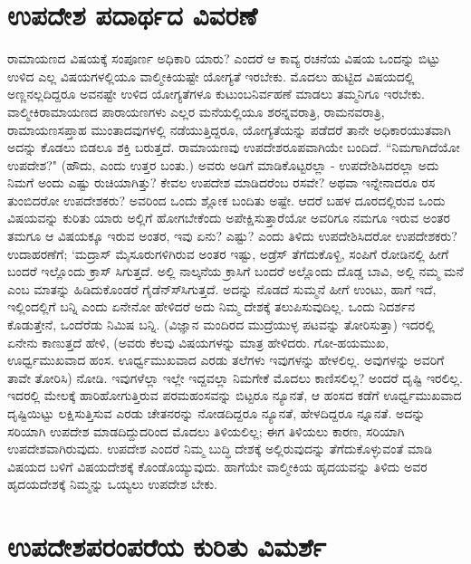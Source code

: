 \section*{ಉಪದೇಶ ಪದಾರ್ಥದ ವಿವರಣೆ} 

ರಾಮಾಯಣದ ವಿಷಯಕ್ಕೆ ಸಂಪೂರ್ಣ ಅಧಿಕಾರಿ ಯಾರು? ಎಂದರೆ ಆ ಕಾವ್ಯ ರಚನೆಯ ವಿಷಯ ಒಂದನ್ನು ಬಿಟ್ಟು ಉಳಿದ ಎಲ್ಲ ವಿಷಯಗಳಲ್ಲಿಯೂ ವಾಲ್ಮೀಕಿಯಷ್ಟೇ ಯೋಗ್ಯತೆ ಇರಬೇಕು. ಮೊದಲು ಹುಟ್ಟಿದ ವಿಷಯದಲ್ಲಿ ಅಣ್ಣನಲ್ಲದಿದ್ದರೂ ಅವನಷ್ಟೇ ಉಳಿದ ಯೋಗ್ಯತೆಗಳೂ ಕುಟುಂಬನಿರ್ವಹಣೆ ಮಾಡಲು ತಮ್ಮನಿಗೂ ಇರಬೇಕು. ವಾಲ್ಮೀಕಿರಾಮಾಯಣದ ಪಾರಾಯಣಗಳು ಎಲ್ಲರ ಮನೆಯಲ್ಲಿಯೂ ಶರನ್ನವರಾತ್ರಿ, ರಾಮನವರಾತ್ರಿ, ರಾಮಾಯಣಸಪ್ತಾಹ ಮುಂತಾದವುಗಳಲ್ಲಿ ನಡೆಯುತ್ತಿದ್ದರೂ, ಯೋಗ್ಯತೆಯನ್ನು ಪಡೆದರೆ ತಾನೇ ಅಧಿಕಾರಯುತವಾಗಿ ಅದನ್ನು ಕೊಡಲು ಬಿಡಲೂ ಶಕ್ತಿ ಬರುತ್ತದೆ. ರಾಮಾಯಣವು ಉಪದೇಶರೂಪವಾಗಿಯೇ ಬಂದಿದೆ. ``ನಿಮಗಾಗಿದೆಯೋ ಉಪದೇಶ?" (ಹೌದು, ಎಂದು ಉತ್ತರ ಬಂತು.) ಅವರು ಅಡಿಗೆ ಮಾಡಿಕೊಟ್ಟರಲ್ಲಾ - ಉಪದೇಶಿಸಿದರಲ್ಲಾ ಅದು ನಿಮಗೆ ಅಂದು ಎಷ್ಟು ರುಚಿಯಾಗಿತ್ತು? ಕೇವಲ ಉಪದೇಶ ಮಾಡಿದರೆಂಬ ರಸವೇ? ಅಥವಾ ಇನ್ನೇನಾದರೂ ರಸ ತುಂಬಿದರೋ ಉಪದೇಶಕರು? ಅವರಿಂದ ಒಂದು ಶ್ಲೋಕ ಬಂದಿತು ಅಷ್ಟೇ. ಆದರೆ ಬಹಳ ದೂರದಲ್ಲಿರುವ ಒಂದು ವಿಷಯವನ್ನು ಕುರಿತು ಯಾರು ಅಲ್ಲಿಗೆ ಹೋಗಬೇಕೆಂದು ಅಪೇಕ್ಷಿಸುತ್ತಾರೆಯೋ ಅವರಿಗೂ ನಮಗೂ ಇರುವ ಅಂತರ ತಮಗೂ ಆ ವಿಷಯಕ್ಕೂ ಇರುವ ಅಂತರ, ಇವು ಏನು? ಎಷ್ಟು? ಎಂದು ತಿಳಿದು ಉಪದೇಶಿಸಿದರೋ ಉಪದೇಶಕರು? ಉದಾಹರಣೆಗೆ; `ಮದ್ರಾಸ್‍ ಮೈಸೂರುಗಳಿಗಿರುವ ಅಂತರ ಇಷ್ಟು, ಅಡ್ರೆಸ್‍ ತೆಗೆದುಕೊಳ್ಖಿ, ಸಂಪಿಗೆ ರೋಡಿನಲ್ಲಿ ಹೀಗೆ ಬಂದರೆ ಇಲ್ಲೊಂದು ಕ್ರಾಸ್‍ ಸಿಗುತ್ತದೆ. ಅಲ್ಲಿ ನಾಲ್ಕನೆಯ ಕ್ರಾಸಿಗೆ ಬಂದರೆ ಅಲ್ಲೊಂದು ದೊಡ್ಡ ಬಾವಿ, ಅಲ್ಲಿ ನಮ್ಮ ಮನೆ ಎಂಬ ಮಾತನ್ನು ಹಿಡಿದುಕೊಂಡರೆ ಗೈಡೆನ್ಸ್‍ಸಿಗುತ್ತದೆ. ಅದನ್ನು ನೊಡದೆ ಸುಮ್ಮನೆ ಹೀಗೆ ಉಂಟು, ಹಾಗೆ ಇದೆ, ಇಲ್ಲಿಂದಲ್ಲಿಗೆ ಬನ್ನಿ ಎಂದು ಏನೇನೋ ಹೇಳಿದರೆ ಅದು ನಿಮ್ಮ ದೇಶಕ್ಕೆ ತಲುಪಿಸುವುದಿಲ್ಲ. ಒಂದು ನಿದರ್ಶನ ಕೊಡುತ್ತೇನೆ, ಒಂದೆರೆಡು ನಿಮಿಷ ಬನ್ನಿ. (ವಿಜ್ಞಾನ ಮಂದಿರದ ಮುದ್ರೆಯುಳ್ಳ ಪಟವನ್ನು ತೋರಿಸುತ್ತಾ) ಇದರಲ್ಲಿ ಏನೇನು ಕಾಣುತ್ತದೆ ಹೇಳಿ, (ಅವರು ಕೆಲವು ವಿಷಯಗಳನ್ನು ಮಾತ್ರ ಹೇಳಿದರು. ಗೋ-ಹಯಮುಖ, ಊರ್ಧ್ವಮುಖವಾದ ಹಂಸ. ಊರ್ಧ್ವಮುಖವಾದ ಎರಡು ತಲೆಗಳು ಇವುಗಳನ್ನು ಹೇಳಲಿಲ್ಲ. ಅವುಗಳನ್ನು ಅವರಿಗೆ ತಾವೇ ತೋರಿಸಿ) ನೋಡಿ. ಇವುಗಳೆಲ್ಲಾ ಇಲ್ಲೇ ಇದ್ದವಲ್ಲಾ ನಿಮಗೇಕೆ ಮೊದಲು ಕಾಣಿಸಲಿಲ್ಲ? ಅಂದರೆ ದೃಷ್ಟಿ ಇರಲಿಲ್ಲ. ಇದರಲ್ಲಿ ಮೇಲಕ್ಕೆ ಹಾರಿಹೋಗುತ್ತಿರುವ ಪರಮಹಂಸವನ್ನು ಬಿಟ್ಟರೂ ನ್ಯೂನತೆ, ಆ ಹಂಸದ ಕಡೆಗೆ ಊರ್ಧ್ವಮುಖವಾದ ದೃಷ್ಟಿಯಿಟ್ಟು ಲಕ್ಷಿಸುತ್ತಿಸುವ ಎರಡು ಚೇತನರನ್ನು ನೋಡದಿದ್ದರೂ ನ್ಯೂನತೆ, ಹೇಳದಿದ್ದರೂ ನ್ನೂನತೆ. ಅದನ್ನು ಸರಿಯಾಗಿ ಉಪದೇಶ ಮಾಡದಿದ್ದುದರಿಂದ ಮೊದಲು ತಿಳಿಯಲಿಲ್ಲ; ಈಗ ತಿಳಿಯಲು ಕಾರಣ, ಸರಿಯಾಗಿ ಉಪದೇಶವಾಗಿರುವುದು. ಉಪದೇಶ ಎಂದರೆ ನಿಮ್ಮ ಬುದ್ಧಿ ದೇಶಕ್ಕೆ ಅಲ್ಲಿರುವುದನ್ನು ತೆಗೆದುಕೊಳ್ಳುವಂತೆ ಮಾಡಿ ವಿಷಯದ ಬಳಿಗೆ ವಿಷಯದೇಶಕ್ಕೆ ಕೊಂಡೊಯ್ಯುವುದು. ಹಾಗೆಯೇ ವಾಲ್ಮೀಕಿಯ ಹೃದಯವನ್ನು ತಿಳಿದು ಅವರ ಹೃದಯದೇಶಕ್ಕೆ ನಿಮ್ಮನ್ನು ಒಯ್ಯಲು ಉಪದೇಶ ಬೇಕು. 


\section*{ಉಪದೇಶಪರಂಪರೆಯ ಕುರಿತು ವಿಮರ್ಶೆ} 


